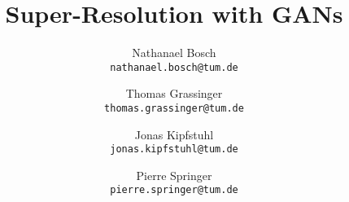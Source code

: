 \documentclass[10pt,twocolumn,letterpaper]{article}
\begin{document}
\title{Super-Resolution with GANs}

\author{Nathanael Bosch\\
{\tt\small nathanael.bosch@tum.de}
\and
Thomas Grassinger\\
{\tt\small thomas.grassinger@tum.de}
\and
Jonas Kipfstuhl\\
{\tt\small jonas.kipfstuhl@tum.de}
\and
Pierre Springer\\
{\tt\small pierre.springer@tum.de}
}


\maketitle

%


\end{document}
